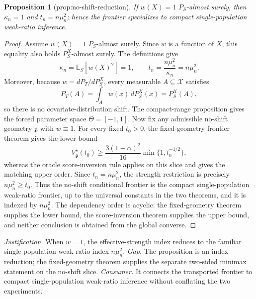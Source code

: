 \documentclass{article}
\newtheorem{proposition}{Proposition}
\begin{document}
\begin{proposition}[prop:no-shift-reduction]\label{prop:no-shift-reduction}
If \(w(X)=1\) \(P_S\)-almost surely, then \(\kappa_n=1\) and \(t_n=n\mu_n^2\); hence the frontier specializes to compact single-population weak-ratio inference.
\end{proposition}
\begin{proof}
Assume \(w(X)=1\) \(P_S\)-almost surely. Since \(w\) is a function of \(X\), this equality also holds \(P_S^X\)-almost surely. The definitions give
\[
 \kappa_n=\mathbb E_S[w(X)^2]=1,
 \qquad
 t_n=\frac{n\mu_n^2}{\kappa_n}=n\mu_n^2.
\]
Moreover, because \(w=dP_T/dP_S^X\), every measurable \(A\subseteq\mathcal X\) satisfies
\[
 P_T(A)=\int_Aw(x)\,dP_S^X(x)=P_S^X(A),
\]
so there is no covariate-distribution shift. The compact-range proposition gives the forced parameter space \(\Theta=[-1,1]\). Now fix any admissible no-shift geometry \(\mathfrak g\) with \(w\equiv1\). For every fixed \(t_0>0\), the fixed-geometry frontier theorem gives the lower bound
\[
 V_{\mathfrak g}^\star(t_0)
 \ge \frac{3(1-\alpha)^2}{16}
 \min\{1,t_0^{-1/2}\},
\]
whereas the oracle score-inversion rule applies on this slice and gives the matching upper order. Since \(t_n=n\mu_n^2\), the strength restriction is precisely \(n\mu_n^2\ge t_0\). Thus the no-shift conditional frontier is the compact single-population weak-ratio frontier, up to the universal constants in the two theorems, and it is indexed by \(n\mu_n^2\). The dependency order is acyclic: the fixed-geometry theorem supplies the lower bound, the score-inversion theorem supplies the upper bound, and neither conclusion is obtained from the global converse.
\end{proof}
\par\smallskip\noindent \textit{Justification.} When \(w=1\), the effective-strength index reduces to the familiar single-population weak-ratio index \(n\mu_n^2\). \textit{Gap.} The proposition is an index reduction; the fixed-geometry theorem supplies the separate two-sided minimax statement on the no-shift slice. \textit{Consumer.} It connects the transported frontier to compact single-population weak-ratio inference without conflating the two experiments.
\end{document}
